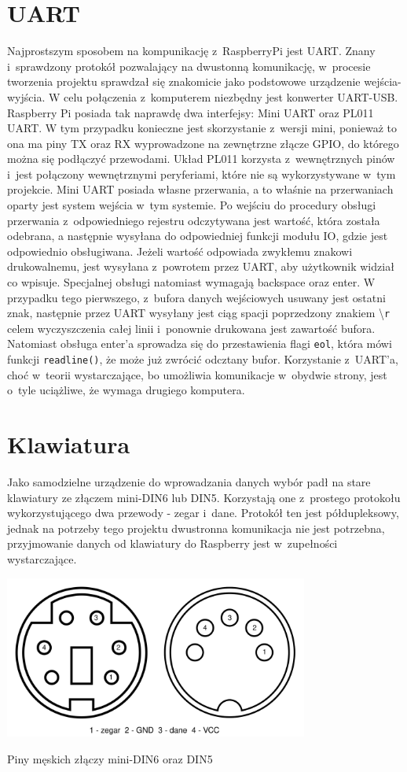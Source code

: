 \documentclass[shortabstract]{iithesis}
\begin{document}
\section{UART}
Najprostszym sposobem na kompunikację z~RaspberryPi jest UART. Znany i~sprawdzony protokół pozwalający na dwustonną komunikację, w~procesie tworzenia projektu sprawdzał się znakomicie jako podstowowe urządzenie wejścia-wyjścia. W celu połączenia z~komputerem niezbędny jest konwerter UART-USB.
Raspberry Pi posiada tak naprawdę dwa interfejsy: Mini UART oraz PL011 UART. W tym przypadku konieczne jest skorzystanie z~wersji mini, ponieważ to ona ma piny TX oraz RX wyprowadzone na zewnętrzne złącze GPIO, do którego można się podłączyć przewodami. Układ PL011 korzysta z~wewnętrznych pinów i~jest połączony wewnętrznymi peryferiami, które nie są wykorzystywane w~tym projekcie.
Mini UART posiada własne przerwania, a to właśnie na przerwaniach oparty jest system wejścia w~tym systemie. Po wejściu do procedury obsługi przerwania z~odpowiedniego rejestru odczytywana jest wartość, która została odebrana, a następnie wysyłana do odpowiedniej funkcji modułu IO, gdzie jest odpowiednio obsługiwana. Jeżeli wartość odpowiada zwykłemu znakowi drukowalnemu, jest wysyłana z~powrotem przez UART, aby użytkownik widział co wpisuje. Specjalnej obsługi natomiast wymagają backspace oraz enter. W przypadku tego pierwszego, z~bufora danych wejściowych usuwany jest ostatni znak, następnie przez UART wysyłany jest ciąg spacji poprzedzony znakiem \textbackslash \texttt{r} celem wyczyszczenia całej linii i~ponownie drukowana jest zawartość bufora. Natomiast obsługa enter'a sprowadza się do przestawienia flagi \texttt{eol}, która mówi funkcji \texttt{readline()}, że może już zwrócić odcztany bufor.
Korzystanie z~UART'a, choć w~teorii wystarczające, bo umożliwia komunikacje w~obydwie strony, jest o~tyle uciążliwe, że wymaga drugiego komputera.

\section{Klawiatura}
Jako samodzielne urządzenie do wprowadzania danych wybór padł na stare klawiatury ze złączem mini-DIN6 lub DIN5. Korzystają one z~prostego protokołu wykorzystującego dwa przewody - zegar i~dane. Protokół ten jest półdupleksowy, jednak na potrzeby tego projektu dwustronna komunikacja nie jest potrzebna, przyjmowanie danych od klawiatury do Raspberry jest w~zupełności wystarczające.

\begingroup
\centering
\includegraphics[width=0.75\textwidth]{pinout.png}
\captionsetup{type=figure}
\caption{Piny męskich złączy mini-DIN6 oraz DIN5}
\endgroup
\end{document}

